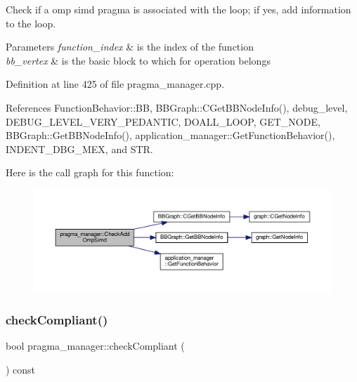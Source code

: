 Check if a omp simd pragma is associated with the loop; if yes, add information to the loop. 


\begin{DoxyParams}{Parameters}
{\em function\+\_\+index} & is the index of the function \\
\hline
{\em bb\+\_\+vertex} & is the basic block to which for operation belongs \\
\hline
\end{DoxyParams}


Definition at line 425 of file pragma\+\_\+manager.\+cpp.



References Function\+Behavior\+::\+BB, B\+B\+Graph\+::\+C\+Get\+B\+B\+Node\+Info(), debug\+\_\+level, D\+E\+B\+U\+G\+\_\+\+L\+E\+V\+E\+L\+\_\+\+V\+E\+R\+Y\+\_\+\+P\+E\+D\+A\+N\+T\+IC, D\+O\+A\+L\+L\+\_\+\+L\+O\+OP, G\+E\+T\+\_\+\+N\+O\+DE, B\+B\+Graph\+::\+Get\+B\+B\+Node\+Info(), application\+\_\+manager\+::\+Get\+Function\+Behavior(), I\+N\+D\+E\+N\+T\+\_\+\+D\+B\+G\+\_\+\+M\+EX, and S\+TR.

Here is the call graph for this function\+:
\nopagebreak
\begin{figure}[H]
\begin{center}
\leavevmode
\includegraphics[width=350pt]{d2/d1d/classpragma__manager_ad95c048bc928e1a762807c74796a1fdc_cgraph}
\end{center}
\end{figure}
\mbox{\label{classpragma__manager_a9394087bc283275fdc9209e7df1694d9}} 
\subsubsection{\texorpdfstring{check\+Compliant()}{checkCompliant()}}
{\footnotesize\ttfamily bool pragma\+\_\+manager\+::check\+Compliant (\begin{DoxyParamCaption}{ }\end{DoxyParamCaption}) const}




